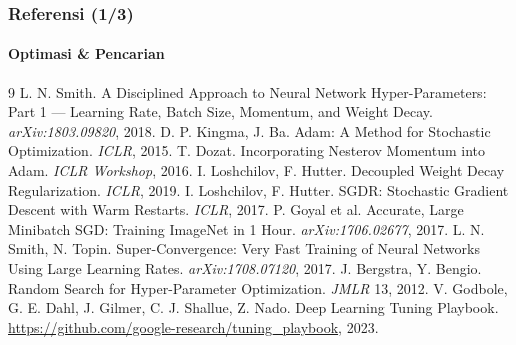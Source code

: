\documentclass[t,aspectratio=169,xcolor={dvipsnames,table}]{beamer}
\begin{document}
\begin{frame}
    \frametitle{Referensi (1/3)}
    \framesubtitle{Optimasi \& Pencarian}
    \scriptsize
    \begin{thebibliography}{9}
         L. N. Smith. A Disciplined Approach to Neural Network Hyper-Parameters: Part 1 --- Learning Rate, Batch Size, Momentum, and Weight Decay. \textit{arXiv:1803.09820}, 2018.
         D. P. Kingma, J. Ba. Adam: A Method for Stochastic Optimization. \textit{ICLR}, 2015.
         T. Dozat. Incorporating Nesterov Momentum into Adam. \textit{ICLR Workshop}, 2016.
         I. Loshchilov, F. Hutter. Decoupled Weight Decay Regularization. \textit{ICLR}, 2019.
         I. Loshchilov, F. Hutter. SGDR: Stochastic Gradient Descent with Warm Restarts. \textit{ICLR}, 2017.
         P. Goyal et al. Accurate, Large Minibatch SGD: Training ImageNet in 1 Hour. \textit{arXiv:1706.02677}, 2017.
         L. N. Smith, N. Topin. Super-Convergence: Very Fast Training of Neural Networks Using Large Learning Rates. \textit{arXiv:1708.07120}, 2017.
         J. Bergstra, Y. Bengio. Random Search for Hyper-Parameter Optimization. \textit{JMLR} 13, 2012.
         V. Godbole, G. E. Dahl, J. Gilmer, C. J. Shallue, Z. Nado. Deep Learning Tuning Playbook. \url{https://github.com/google-research/tuning_playbook}, 2023.
    \end{thebibliography}
\end{frame}
\end{document}

